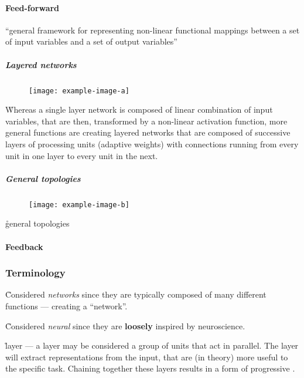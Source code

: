 \paragraph{Feed-forward}

\r{``general framework for representing non-linear functional mappings between a set of input variables and a set of output variables''}

\subparagraph{Layered networks}

\begin{figure}[htp]
	\centering
	\texttt{[image: example-image-a]}\hfil
	\caption{}
	\label{fig:foundations_ann_layered_network}
\end{figure}

\r{Whereas a single layer network is composed of linear combination of input variables, that are then, transformed by a non-linear activation function, more general functions are creating layered networks that are composed of successive layers of processing units (adaptive weights) with connections running from every unit in one layer to every unit in the next.}

\subparagraph{General topologies}

\begin{figure}[htp]
	\centering
	\texttt{[image: example-image-b]}\hfil
	\caption{}
	\label{fig:foundations_ann_general_topology}
\end{figure}

\r{general topologies}

\paragraph{Feedback}

\subsubsection{Terminology}

\r{Considered \textit{networks} since they are typically composed of many different functions --- creating a ``network''.}

\r{Considered \textit{neural} since they are \textbf{loosely} inspired by neuroscience.}

\r{layer --- a layer may be considered a group of units that act in parallel. The layer will extract representations from the input, that are (in theory) more useful to the specific task.  Chaining together these layers results in a form of progressive .}

